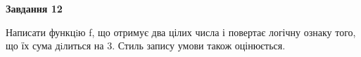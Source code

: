 \documentclass[12pt, ukrainian]{article}
\begin{document}
{\begin {large}
\begin{minipage}[t]{11.0cm}
\begin{center}
\textbf{Завдання 12}
\end{center}

Написати функцiю f, що отримує два цілих числа і повертає логічну ознаку того, що їх сума дiлиться на 3. Стиль запису умови також оцінюється.\par

\end{minipage}

\end {large}}
\newpage

\end{document}
